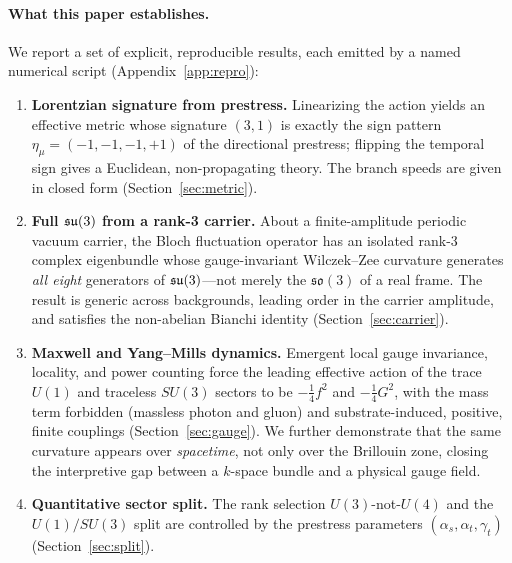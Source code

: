 \paragraph{What this paper establishes.} We report a set of explicit, reproducible
results, each emitted by a named numerical script (Appendix~\ref{app:repro}):
\begin{enumerate}
  \item \textbf{Lorentzian signature from prestress.} Linearizing the action yields an
  effective metric whose signature $(3,1)$ is exactly the sign pattern
  $\eta_\mu=(-1,-1,-1,+1)$ of the directional prestress; flipping the temporal sign
  gives a Euclidean, non-propagating theory. The branch speeds are given in closed form
  (Section~\ref{sec:metric}).
  \item \textbf{Full $\mathfrak{su}(3)$ from a rank-3 carrier.} About a finite-amplitude periodic
  vacuum carrier, the Bloch fluctuation operator has an isolated rank-3 complex
  eigenbundle whose gauge-invariant Wilczek--Zee curvature generates \emph{all eight}
  generators of $\mathfrak{su}(3)$---not merely the $\mathfrak{so}(3)$ of a real frame. The result
  is generic across backgrounds, leading order in the carrier amplitude, and satisfies
  the non-abelian Bianchi identity (Section~\ref{sec:carrier}).
  \item \textbf{Maxwell and Yang--Mills dynamics.} Emergent local gauge invariance,
  locality, and power counting force the leading effective action of the trace $U(1)$ and
  traceless $SU(3)$ sectors to be $-\tfrac14 f^2$ and $-\tfrac14 G^2$, with the mass term
  forbidden (massless photon and gluon) and substrate-induced, positive, finite couplings
  (Section~\ref{sec:gauge}). We further demonstrate that the same curvature appears over
  \emph{spacetime}, not only over the Brillouin zone, closing the interpretive gap
  between a $k$-space bundle and a physical gauge field.
  \item \textbf{Quantitative sector split.} The rank selection $U(3)$-not-$U(4)$ and the
  $U(1)/SU(3)$ split are controlled by the prestress parameters
  $(\alpha_s,\alpha_t,\gamma_t)$ (Section~\ref{sec:split}).
\end{enumerate}

